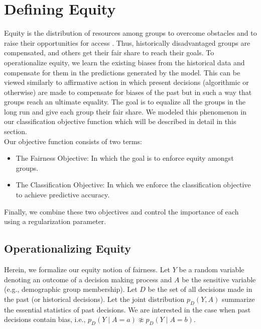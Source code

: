 \section{Defining Equity}
Equity is the distribution of resources among groups to overcome obstacles and to raise their opportunities for access \cite{schement2001imagining}. Thus, historically disadvantaged groups are compensated, and others get their fair share to reach their goals. To operationalize equity, we learn the existing biases from the historical data and compensate for them in the predictions generated by the model. This can be viewed similarly to affirmative action in which present decisions (algorithmic or otherwise) are made to compensate for biases of the past but in such a way that groups reach an ultimate equality. The goal is to equalize all the groups in the long run and give each group their fair share.%
We modeled this phenomenon in our classification objective function which will be described in detail in this section. \\ 
Our objective function consists of two terms:
\begin{itemize}
    \item The Fairness Objective: In which the goal is to enforce equity amongst groups.
    \item The Classification Objective: In which we enforce the classification objective to achieve predictive accuracy.
\end{itemize}
Finally, we combine these two objectives and control the importance of each using a regularization parameter. %
\subsection{Operationalizing Equity}
Herein, we formalize our equity notion of fairness. Let $Y$ be a random variable denoting an outcome of a decision making process and $A$ be the sensitive variable (e.g., demographic group membership).  
Let $D$ be the set of all decisions made in the past (or historical decisions).
Let the joint distribution $p_D(Y, A)$ summarize the essential statistics of past decisions.
We are interested in the case when past decisions contain bias, i.e., $p_D(Y\mid A=a) \not\approx p_D(Y \mid A=b)$.

